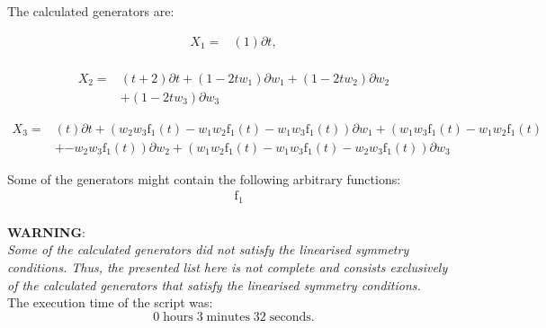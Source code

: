 \noindent The calculated generators are:

\begin{align*}
X_{1}=&\left(1 \right)\partial t,\\
\end{align*}

\begin{align*}
X_{2}=&\left(t+2 \right)\partial t+\left(1- 2 t w_{1} \right)\partial w_{1}+\left(1- 2 t w_{2} \right)\partial w_{2}\\
&+\left(1- 2 t w_{3} \right)\partial w_{3}
\end{align*}

\begin{align*}
X_{3}=&\left(t \right)\partial t+\left(w_{2} w_{3} \operatorname{f_{1}}{\left(t \right)}- w_{1} w_{2} \operatorname{f_{1}}{\left(t \right)}- w_{1} w_{3} \operatorname{f_{1}}{\left(t \right)} \right)\partial w_{1}+\left(w_{1} w_{3} \operatorname{f_{1}}{\left(t \right)}- w_{1} w_{2} \operatorname{f_{1}}{\left(t \right)}\right.\\
&+\left.- w_{2} w_{3} \operatorname{f_{1}}{\left(t \right)} \right)\partial w_{2}+\left(w_{1} w_{2} \operatorname{f_{1}}{\left(t \right)}- w_{1} w_{3} \operatorname{f_{1}}{\left(t \right)}- w_{2} w_{3} \operatorname{f_{1}}{\left(t \right)} \right)\partial w_{3}
\end{align*}



\noindent Some of the generators might contain the following arbitrary functions:
\begin{align*}
&\operatorname{f_{1}}\\
\end{align*}

\noindent\huge\textbf{WARNING}:\\
\noindent\Large\textit{Some of the calculated generators did not satisfy the linearised symmetry conditions. Thus, the presented list here is not complete and consists exclusively of the calculated generators that satisfy the linearised symmetry conditions.}\normalsize\\[2cm]
\noindent The execution time of the script was:
$$0\;\mathrm{hours}\;3\;\mathrm{minutes}\;32 \;\mathrm{seconds}.$$
